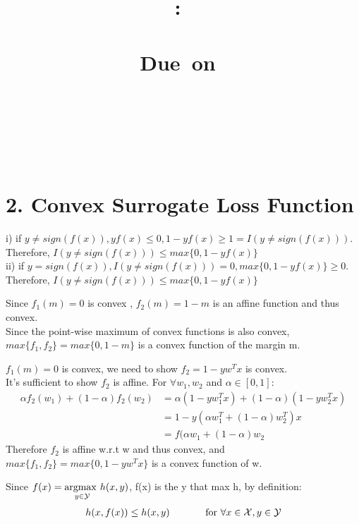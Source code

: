\documentclass{article}
\title{
    \vspace{2in}
    \textmd{\textbf{\hmwkClass:\ \hmwkTitle \\ \hmwksubtitle }}\\
    \vspace{1in}
    \normalsize\vspace{0.1in}\small{Due\ on\ \hmwkDueDate}\\
    \vspace{0.1in}\large{\textit{\hmwkClassInstructor}}\\
    \vspace{3in}
    \author{\textbf{\hmwkAuthorName} \\ \textbf{\hmwknetid }\\ }
    \vspace{0.2in}
    \gihub
}
\date{}
\newenvironment{problem}[2][$\bullet$]{\begin{trivlist}\large
		\item[\hskip \labelsep {\bfseries #1}\hskip \labelsep {\bfseries #2.}]}  {\end{trivlist}}
\newenvironment{sub}[2][$-$]{\begin{trivlist}
		\item[\hskip \labelsep {\bfseries #1}\hskip \labelsep {\bfseries #2.}]}  {\end{trivlist}}
\begin{document}
\maketitle

\pagebreak


\section{2. Convex Surrogate Loss Function }

\begin{problem}{2.1 Hinge loss is a convex surrogate for 0/1 loss}
\end{problem}

\begin{sub}{2.1.1}
\end{sub}
i) if $y \neq sign(f(x)), yf(x) \leq 0, 1-yf(x) \geq 1 = I(y \neq sign(f(x)))$.\\ Therefore, $I (y \neq sign(f(x))) \leq max\{0, 1-yf(x)\}$\\
ii) if $y = sign(f(x)), I(y \neq sign(f(x))) = 0, max\{0, 1-yf(x)\} \geq 0$.\\ 
Therefore, $I (y \neq sign(f(x))) \leq max\{0, 1-yf(x)\}$

\begin{sub}{2.1.2}
\end{sub}
Since $f_1(m) = 0$ is convex , $f_2(m) = 1-m$ is an affine function and thus convex. \\
Since the point-wise maximum of convex functions is also convex, $max\{f_1,f_2 \} = max\{0,1-m\}$ is a convex function of the margin m.

\begin{sub}{2.1.3}
\end{sub} 
$f_1(m) = 0$ is convex, we need to show $f_2 = 1 - yw^Tx$ is convex.\\
It's sufficient to show $f_2$ is affine. For $\forall w_1, w_2$ and $\alpha \in [0,1]$:
\begin{align}
\alpha f_2(w_1) + (1-\alpha) f_2(w_2) &= \alpha (1 - yw_1^Tx) + (1-\alpha) (1- yw_2^Tx)\\
& = 1 - y(\alpha w_1^T + (1-\alpha)w_2^T)x \\ & = f(\alpha w_1 + (1 -\alpha) w_2
\end{align}
Therefore $f_2$ is affine w.r.t w and thus convex, and $max\{f_1, f_2\} = max\{0, 1-yw^Tx \}$ is a convex function of w. 

\begin{problem}{2.2 Multiclass Hinge Loss}
\end{problem}
\begin{sub}{2.2.1}
\end{sub}
Since $f(x) = \underset{y \in \mathcal{Y}}{\operatorname{arg max \hspace{0.05 in}}} h(x,y)$, f(x) is the y that max h, by definition:
\begin{align}
h(x,f(x)) \leq h(x,y)   \hspace{0.5in} \text{for } \forall x \in  \mathcal{X}, y \in  \mathcal{Y}
\end{align}
\end{document}
